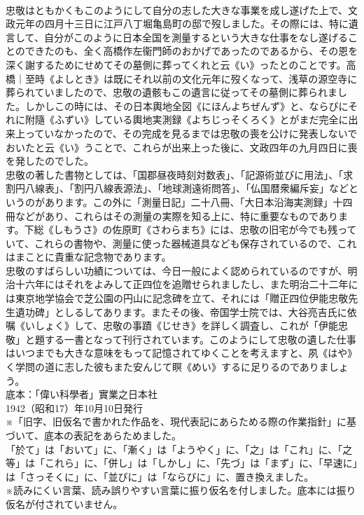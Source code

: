 \documentclass[8pt]{extreport}
\begin{document}
\begin{CJK}{UTF8}{min}
\\	忠敬はともかくもこのようにして自分の志した大きな事業を成し遂げた上で、文政元年の四月十三日に江戸八丁堀亀島町の邸で歿しました。その際には、特に遺言して、自分がこのように日本全国を測量するという大きな仕事をなし遂げることのできたのも、全く高橋作左衞門師のおかげであったのであるから、その恩を深く謝するためにせめてその墓側に葬ってくれと云《い》ったとのことです。高橋｜至時《よしとき》は既にそれ以前の文化元年に歿くなって、浅草の源空寺に葬られていましたので、忠敬の遺骸もこの遺言に従ってその墓側に葬られました。しかしこの時には、その日本輿地全図《にほんよちぜんず》と、ならびにそれに附隨《ふずい》している輿地実測録《よちじっそくろく》とがまだ完全に出来上っていなかったので、その完成を見るまでは忠敬の喪を公けに発表しないでおいたと云《い》うことで、これらが出来上った後に、文政四年の九月四日に喪を発したのでした。
\\	忠敬の著した書物としては、「国郡昼夜時刻対数表」、「記源術並びに用法」、「求割円八線表」、「割円八線表源法」、「地球測遠術問答」、「仏国暦衆編斥妄」などというのがあります。この外に「測量日記」二十八冊、「大日本沿海実測録」十四冊などがあり、これらはその測量の実際を知る上に、特に重要なものであります。下総《しもうさ》の佐原町《さわらまち》には、忠敬の旧宅が今でも残っていて、これらの書物や、測量に使った器械道具なども保存されているので、これはまことに貴重な記念物であります。
\\	忠敬のすばらしい功績については、今日一般によく認められているのですが、明治十六年にはそれをよみして正四位を追贈せられましたし、また明治二十二年には東京地学協会で芝公園の円山に記念碑を立て、それには「贈正四位伊能忠敬先生遺功碑」としるしてあります。またその後、帝国学士院では、大谷亮吉氏に依嘱《いしょく》して、忠敬の事蹟《じせき》を詳しく調査し、これが「伊能忠敬」と題する一書となって刊行されています。このようにして忠敬の遺した仕事はいつまでも大きな意味をもって記憶されてゆくことを考えますと、夙《はや》く学問の道に志した彼もまた安んじて瞑《めい》するに足りるのでありましょう。
\\	底本：「偉い科學者」實業之日本社
\\	1942（昭和17）年10月10日発行
\\	※「旧字、旧仮名で書かれた作品を、現代表記にあらためる際の作業指針」に基づいて、底本の表記をあらためました。
\\	「於て」は「おいて」に、「漸く」は「ようやく」に、「之」は「これ」に、「之等」は「これら」に、「併し」は「しかし」に、「先づ」は「まず」に、「早速に」は「さっそくに」に、「並びに」は「ならびに」に、置き換えました。
\\	※読みにくい言葉、読み誤りやすい言葉に振り仮名を付しました。底本には振り仮名が付されていません。

\end{CJK}
\end{document}
